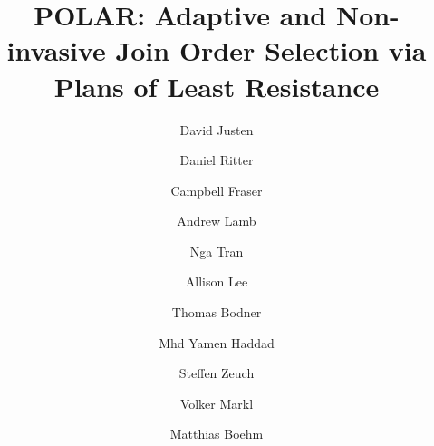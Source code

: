 \documentclass[sigconf,nonacm,screen]{acmart}
\begin{document}
\title{POLAR: Adaptive and Non-invasive Join Order Selection via Plans of Least Resistance}

\author{David Justen}

\author{Daniel Ritter}
\authornotemark[1]

\author{Campbell Fraser}

\author{Andrew Lamb}
\author{Nga Tran}

\author{Allison Lee}

\author{Thomas Bodner}

\author{Mhd Yamen Haddad}

\author{Steffen Zeuch}
\author{Volker Markl}

\author{Matthias Boehm}

\begin{abstract}

\end{abstract}

\maketitle
\end{document}
